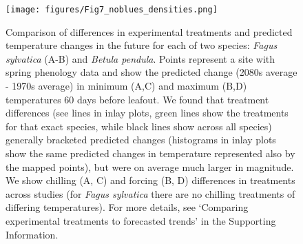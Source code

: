 \documentclass[11pt,letter]{article}
\begin{document}
\clearpage

\begin{figure}[t!]
\centering
\texttt{[image: figures/Fig7\_noblues\_densities.png]}
\caption{Comparison of differences in experimental treatments and predicted temperature changes in the future for each of two species: \emph{Fagus sylvatica} (A-B) and \emph{Betula pendula}. Points represent a site with spring phenology data  \citep[from the PEP725 database,][]{Templ2018} and show the predicted change (2080s average - 1970s average) in minimum (A,C) and maximum (B,D) temperatures 60 days before leafout. We found that treatment differences (see lines in inlay plots, green lines show the treatments for that exact species, while black lines show across all species) generally bracketed predicted changes (histograms in inlay plots show the same predicted changes in temperature represented also by the mapped points), but were on average much larger in magnitude. We show chilling (A, C) and forcing (B, D) differences in treatments across studies (for \emph{Fagus sylvatica} there are no chilling treatments of differing temperatures). For more details, see `Comparing experimental treatments to forecasted trends' in the Supporting Information.}
\label{fig:pep} %
\end{figure}
\end{document}
